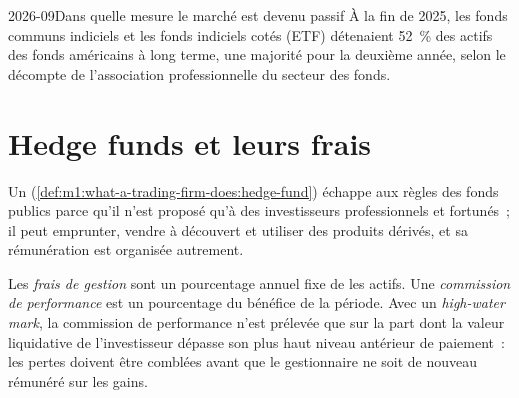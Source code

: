 \begin{omfigure}

\label{fig:m1:the-buy-side:years}
\end{omfigure}

\begin{dated}{2026-09}{Dans quelle mesure le marché est devenu passif}\label{dat:m1:the-buy-side:passive}
À la fin de 2025, les fonds communs indiciels et les fonds indiciels cotés (ETF) détenaient
52~\% des actifs des fonds américains à long terme, une majorité pour la deuxième année, selon
le décompte de l'association professionnelle du secteur des fonds.
\end{dated}

\section{Hedge funds et leurs frais}

Un  (\cref{def:m1:what-a-trading-firm-does:hedge-fund}) échappe aux
règles des fonds publics parce qu'il n'est proposé qu'à des investisseurs
professionnels et fortunés~; il peut emprunter, vendre à découvert et utiliser
des produits dérivés, et sa rémunération est organisée autrement.

\begin{definition}\label{def:m1:the-buy-side:fees}
Les \emph{frais de gestion} sont un pourcentage annuel fixe de
les actifs. Une \emph{commission de performance} est un pourcentage
du bénéfice de la période. Avec un
\emph{high-water mark}, la commission de performance n'est prélevée
que sur la part dont la valeur liquidative de l'investisseur dépasse son
plus haut niveau antérieur de paiement~: les pertes doivent être comblées avant que le
gestionnaire ne soit de nouveau rémunéré sur les gains.
\end{definition}


